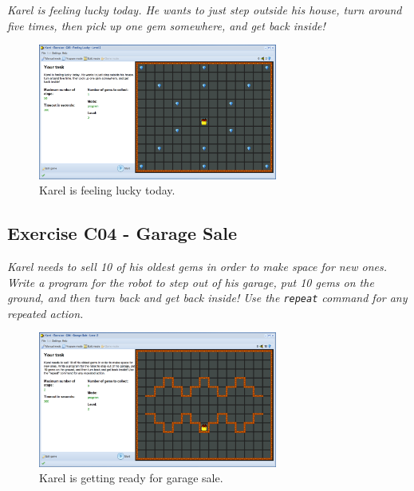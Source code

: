 \documentclass[article,A4,12pt]{llncs}
\begin{document}
{{{{{\em Karel is feeling lucky today. He wants to just step outside his house, 
turn around five times, then pick up one gem somewhere, and get back inside!}


\begin{figure}[!ht]
\begin{center}
\includegraphics[width=0.7\textwidth]{img/c03.png}
\end{center}
\vspace{-4mm}
\caption{Karel is feeling lucky today.}
\label{fig:c03}
\vspace{-4mm}
\end{figure}
\noindent


\subsection{Exercise C04 - Garage Sale}

{\em Karel needs to sell 10 of his oldest gems in order to make space for new ones. 
Write a program for the robot to step out of his garage, put 10 gems on the ground, 
and then turn back and get back inside! Use the {\tt repeat} command for any repeated 
action.}


\begin{figure}[!ht]
\begin{center}
\includegraphics[width=0.7\textwidth]{img/c04.png}
\end{center}
\vspace{-4mm}
\caption{Karel is getting ready for garage sale.}
\label{fig:c04}
\vspace{-10mm}
\end{figure}
\noindent

}}}}
\end{document}
